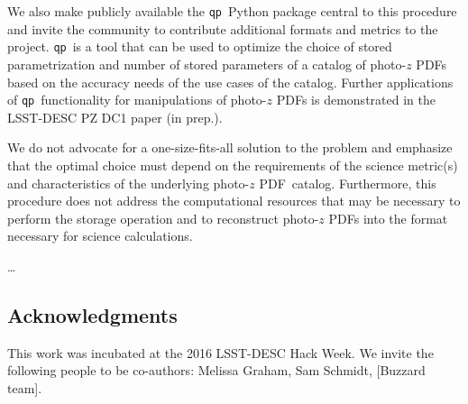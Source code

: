 \documentclass[\docopts]{\docclass}
\newcommand{\qp}{\texttt{qp}}
\newcommand{\pz}{photo-$z$ PDF}
\begin{document}
We also make publicly available the \qp\ Python package central to this 
procedure and invite the community to contribute additional formats and metrics 
to the project.  \qp\ is a tool that can be used to optimize the choice of 
stored parametrization and number of stored parameters of a catalog of \pz s 
based on the accuracy needs of the use cases of the catalog.  Further 
applications of \qp\ functionality for manipulations of \pz s is demonstrated 
in the LSST-DESC PZ DC1 paper (in prep.).

We do not advocate for a one-size-fits-all solution to the problem and 
emphasize that the optimal choice must depend on the requirements of the 
science metric(s) and characteristics of the underlying \pz\ catalog.  
Furthermore, this procedure does not address the computational resources that 
may be necessary to perform the storage operation and to reconstruct \pz s into 
the format necessary for science calculations.

\dots


\subsection*{Acknowledgments}


This work was incubated at the 2016 LSST-DESC Hack Week.  We invite the 
following people to be co-authors: Melissa Graham, Sam Schmidt, [Buzzard team].







\end{document}
